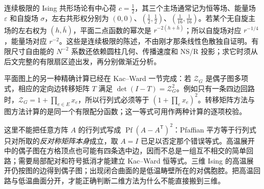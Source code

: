 连续极限的 Ising 共形场论有中心荷 \(c=\tfrac12\)，其三个主场通常记为恒等场、能量场 \(\varepsilon\) 和自旋场 \(\sigma\)，左右共形权分别为 \((0,0)\)、\((\tfrac12,\tfrac12)\)、\((\tfrac1{16},\tfrac1{16})\)。若某个无自旋主场的左右权为 \((h,\bar h)\)，平面二点函数的幂次是 \(r^{-2(h+\bar h)}\)；所以自旋场对应 \(r^{-1/4}\)，能量场对应 \(r^{-2}\)。这些是连续极限的陈述，不由刚才那条线性色散独自证明。有限尺寸自由能的 \(N^{-2}\) 系数还依赖圆柱几何、传播速度和 NS/R 投影；求它时须从后文完整的有限扇区迹出发，再分别做渐近分析。

平面图上的另一种精确计算已经在 Kac--Ward 一节完成：若 \(\mathcal Z_G\) 是偶子图多项式，相应的定向边转移矩阵 \(T\) 满足 \(\det(I-T)=\mathcal Z_G^2\)。例如只有一条四边回路时，\(\mathcal Z_G=1+\prod_{e\in E}x_e\)，所以行列式必须等于 \((1+\prod_e x_e)^2\)。转移矩阵方法与图方法计算的是同一个有限配分函数；这一等式可用作两种计算的逐项校验。

这里不能把任意方阵 \(A\) 的行列式写成 \(\operatorname{Pf}(A-A^{\mathsf T})^2\)：Pfaffian 平方等于行列式只对所取的\emph{反对称矩阵本身}成立，取 \(A=I\) 已足以否定那个错误等式。高温展开中的偶子图在方格顶点也可能有四条选中边，因而不总是一组互不相交的简单回路；需要局部配对和符号抵消才能建立 Kac--Ward 恒等式。三维 Ising 的高温展开仍按图的边得到偶子图；出现闭合曲面的是低温畴壁所在的对偶胞腔。把高温回路与低温曲面分开，才能正确判断二维方法为什么不能直接搬到三维。
